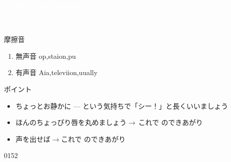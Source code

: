\documentclass[aspectratio=169,xcolor={dvipsnames,table}]{beamer}
\begin{document}
\begin{frame}
\centering
  \textcolor{white}{\Huge\bfseries Today's Pronunciation}\pause

 \vspace{30pt}

  \textcolor{white}{\Huge\bfseries {}, }
\end{frame}
 \begin{frame}[plain,label=slide_textesh_textyogh]{摩擦音}

\large

\begin{enumerate}
 \item  無声音 \hspace{20pt}op,\hspace{1\zw}staion,\hspace{1\zw}pu
 \item  有声音 \hspace{20pt}Aia,\hspace{1\zw}televiion,\hspace{1\zw}uually
\end{enumerate}

\vspace*{20pt}

\normalsize
ポイント

\begin{itemize}[circle]
 \item ちょっとお静かに --- という気持ちで「シー！」と長くいいましょう
 \item ほんのちょっぴり唇を丸めましょう$\rightarrow$\,これで\,\,のできあがり 
 \item 声を出せば$\rightarrow$これで\,\,のできあがり
\end{itemize}
\hfill{\tiny 0152}\,{\scriptsize {}}

\end{frame}
\end{document}
